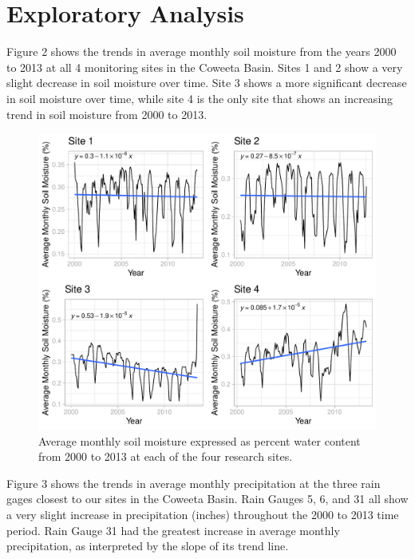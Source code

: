 \documentclass[
  12pt,
]{article}
\begin{document}
\newpage

\hypertarget{exploratory-analysis}{%
\section{Exploratory Analysis}\label{exploratory-analysis}}

Figure 2 shows the trends in average monthly soil moisture from the
years 2000 to 2013 at all 4 monitoring sites in the Coweeta Basin. Sites
1 and 2 show a very slight decrease in soil moisture over time. Site 3
shows a more significant decrease in soil moisture over time, while site
4 is the only site that shows an increasing trend in soil moisture from
2000 to 2013.

\begin{figure}
\centering
\includegraphics{Project_Report_Davidson_McClaugherty_Zungailia_files/figure-latex/Average Monthly Soil Moisture Cowplot-1.pdf}
\caption{Average monthly soil moisture expressed as percent water
content from 2000 to 2013 at each of the four research sites.}
\end{figure}

\newpage

Figure 3 shows the trends in average monthly precipitation at the three
rain gages closest to our sites in the Coweeta Basin. Rain Gauges 5, 6,
and 31 all show a very slight increase in precipitation (inches)
throughout the 2000 to 2013 time period. Rain Gauge 31 had the greatest
increase in average monthly precipitation, as interpreted by the slope
of its trend line.
\end{document}
